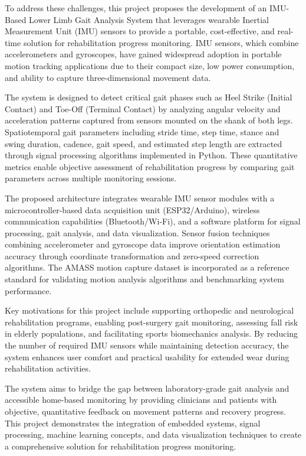 \documentclass[12pt,a4paper]{report}
\begin{document}
To address these challenges, this project proposes the development of an IMU-Based Lower Limb Gait Analysis System that leverages wearable Inertial Measurement Unit (IMU) sensors to provide a portable, cost-effective, and real-time solution for rehabilitation progress monitoring. IMU sensors, which combine accelerometers and gyroscopes, have gained widespread adoption in portable motion tracking applications due to their compact size, low power consumption, and ability to capture three-dimensional movement data.

The system is designed to detect critical gait phases such as Heel Strike (Initial Contact) and Toe-Off (Terminal Contact) by analyzing angular velocity and acceleration patterns captured from sensors mounted on the shank of both legs. Spatiotemporal gait parameters including stride time, step time, stance and swing duration, cadence, gait speed, and estimated step length are extracted through signal processing algorithms implemented in Python. These quantitative metrics enable objective assessment of rehabilitation progress by comparing gait parameters across multiple monitoring sessions.

The proposed architecture integrates wearable IMU sensor modules with a microcontroller-based data acquisition unit (ESP32/Arduino), wireless communication capabilities (Bluetooth/Wi-Fi), and a software platform for signal processing, gait analysis, and data visualization. Sensor fusion techniques combining accelerometer and gyroscope data improve orientation estimation accuracy through coordinate transformation and zero-speed correction algorithms. The AMASS motion capture dataset is incorporated as a reference standard for validating motion analysis algorithms and benchmarking system performance.

Key motivations for this project include supporting orthopedic and neurological rehabilitation programs, enabling post-surgery gait monitoring, assessing fall risk in elderly populations, and facilitating sports biomechanics analysis. By reducing the number of required IMU sensors while maintaining detection accuracy, the system enhances user comfort and practical usability for extended wear during rehabilitation activities.

The system aims to bridge the gap between laboratory-grade gait analysis and accessible home-based monitoring by providing clinicians and patients with objective, quantitative feedback on movement patterns and recovery progress. This project demonstrates the integration of embedded systems, signal processing, machine learning concepts, and data visualization techniques to create a comprehensive solution for rehabilitation progress monitoring.
\end{document}
